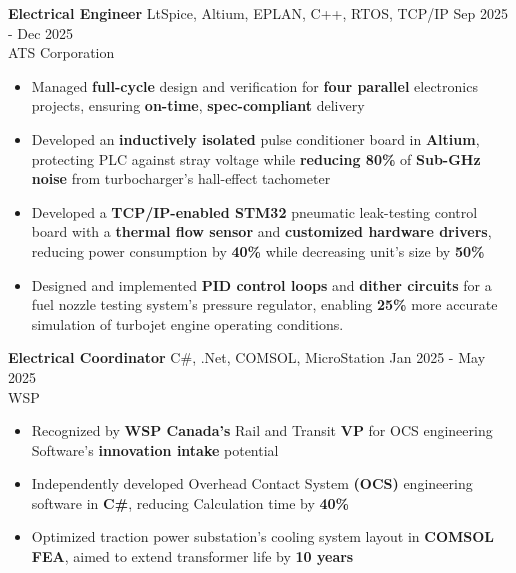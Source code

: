\documentclass[10pt]{article}
\begin{document}
\noindent\textbf{Electrical Engineer} \hspace{\WEVBsep}\textbar\hspace{\WEVBsep} LtSpice, Altium, EPLAN, C++, RTOS, TCP/IP  \hfill Sep 2025 - Dec 2025 \\[\TtCsep]
ATS Corporation \\[\CtPsep]
\begin{itemize}
    \item Managed \textbf{full-cycle} design and verification for \textbf{four parallel} electronics projects, ensuring \textbf{on-time}, \textbf{spec-compliant} delivery \\[\PtPsep]
    \item Developed an \textbf{inductively isolated} pulse conditioner board in \textbf{Altium}, protecting PLC against stray voltage while \textbf{reducing 80\%} of \textbf{Sub-GHz noise} from turbocharger’s hall-effect tachometer\\[\PtPsep]
    \item Developed a \textbf{TCP/IP-enabled STM32} pneumatic leak-testing control board with a \textbf{thermal flow sensor} and \textbf{customized hardware drivers}, reducing power consumption by \textbf{40\%} while decreasing unit’s size by \textbf{50\%} \\[\PtPsep]
    \item Designed and implemented \textbf{PID control loops} and \textbf{dither circuits} for a fuel nozzle testing system’s pressure regulator, \hspace{4em} enabling \textbf{25\%} more accurate simulation of turbojet engine operating conditions. \\[\WStWSsep]
    
\end{itemize}

\noindent\textbf{Electrical Coordinator} \hspace{\WEVBsep}\textbar\hspace{\WEVBsep} C\#, .Net, COMSOL, MicroStation  \hfill Jan 2025 - May 2025 \\[\TtCsep]
WSP \\[\CtPsep]
\begin{itemize}
    \item Recognized by \textbf{\small WSP Canada’s} Rail and Transit \textbf{\small VP} for OCS engineering Software’s \textbf{innovation intake} potential \\[\PtPsep]
    \item Independently developed Overhead Contact System \textbf{\small (OCS)} engineering software in\textbf{ C\#}, reducing Calculation time by \textbf{40\%} \\[\PtPsep]
    \item Optimized traction power substation’s cooling system layout in \textbf{\small COMSOL FEA}, aimed to extend transformer life by \textbf{10 years} \\[\PtPsep]
\end{itemize}
\end{document}
